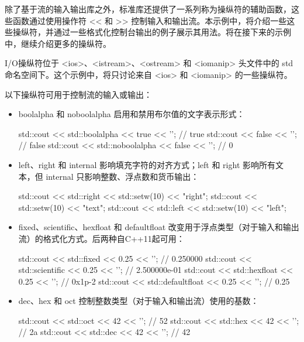 除了基于流的输入输出库之外，标准库还提供了一系列称为操纵符的辅助函数，这些函数通过使用操作符 <{}< 和 >{}> 控制输入和输出流。本示例中，将介绍一些这些操纵符，并通过一些格式化控制台输出的例子展示其用法。将在接下来的示例中，继续介绍更多的操纵符。


I/O操纵符位于 <ios>、<istream>、<ostream> 和 <iomanip> 头文件中的 std 命名空间下。这个示例中，将只讨论来自 <ios> 和 <iomanip> 的一些操纵符。


以下操纵符可用于控制流的输入或输出：

\begin{itemize}
\item
boolalpha 和 noboolalpha 启用和禁用布尔值的文字表示形式：

\begin{cpp}
std::cout << std::boolalpha << true << '\n';    // true
std::cout << false << '\n';                     // false
std::cout << std::noboolalpha << false << '\n'; // 0
\end{cpp}

\item
left、right 和 internal 影响填充字符的对齐方式；left 和 right 影响所有文本，但 internal 只影响整数、浮点数和货币输出：

\begin{cpp}
std::cout << std::right << std::setw(10) << "right\n";
std::cout << std::setw(10) << "text\n";
std::cout << std::left << std::setw(10) << "left\n";
\end{cpp}

\item
fixed、scientific、hexfloat 和 defaultfloat 改变用于浮点类型（对于输入和输出流）的格式化方式。后两种自C++11起可用：

\begin{cpp}
std::cout << std::fixed << 0.25 << '\n';         // 0.250000
std::cout << std::scientific << 0.25 << '\n';    // 2.500000e-01
std::cout << std::hexfloat << 0.25 << '\n';      // 0x1p-2
std::cout << std::defaultfloat << 0.25 << '\n';  // 0.25
\end{cpp}

\item
dec、hex 和 oct 控制整数类型（对于输入和输出流）使用的基数：

\begin{cpp}
std::cout << std::oct << 42 << '\n'; // 52
std::cout << std::hex << 42 << '\n'; // 2a
std::cout << std::dec << 42 << '\n'; // 42
\end{cpp}


\end{itemize}
